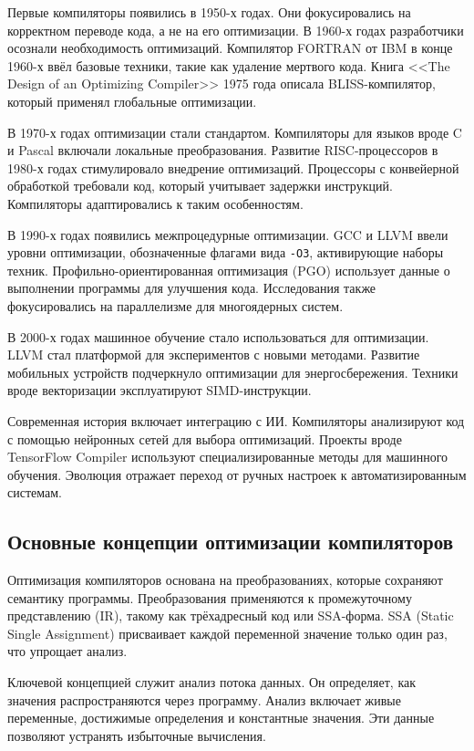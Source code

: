 Первые компиляторы появились в 1950-х годах. Они фокусировались на корректном переводе кода, а не на его оптимизации. В 1960-х годах разработчики осознали необходимость оптимизаций. Компилятор FORTRAN от IBM в конце 1960-х ввёл базовые техники, такие как удаление мертвого кода. Книга <<The Design of an Optimizing Compiler>> 1975 года описала BLISS-компилятор, который применял глобальные оптимизации.

В 1970-х годах оптимизации стали стандартом. Компиляторы для языков вроде C и Pascal включали локальные преобразования. Развитие RISC-процессоров в 1980-х годах стимулировало внедрение оптимизаций. Процессоры с конвейерной обработкой требовали код, который учитывает задержки инструкций. Компиляторы адаптировались к таким особенностям.

В 1990-х годах появились межпроцедурные оптимизации. GCC и LLVM ввели уровни оптимизации, обозначенные флагами вида \texttt{-O3}, активирующие наборы техник. Профильно-ориентированная оптимизация (PGO) использует данные о выполнении программы для улучшения кода. Исследования также фокусировались на параллелизме для многоядерных систем.

В 2000-х годах машинное обучение стало использоваться для оптимизации. LLVM стал платформой для экспериментов с новыми методами. Развитие мобильных устройств подчеркнуло оптимизации для энергосбережения. Техники вроде векторизации эксплуатируют SIMD-инструкции.

Современная история включает интеграцию с ИИ. Компиляторы анализируют код с помощью нейронных сетей для выбора оптимизаций. Проекты вроде TensorFlow Compiler используют специализированные методы для машинного обучения. Эволюция отражает переход от ручных настроек к автоматизированным системам.

\subsection{Основные концепции оптимизации компиляторов}

Оптимизация компиляторов основана на преобразованиях, которые сохраняют семантику программы. Преобразования применяются к промежуточному представлению (IR), такому как трёхадресный код или SSA-форма. SSA (Static Single Assignment) присваивает каждой переменной значение только один раз, что упрощает анализ.

Ключевой концепцией служит анализ потока данных. Он определяет, как значения распространяются через программу. Анализ включает живые переменные, достижимые определения и константные значения. Эти данные позволяют устранять избыточные вычисления.

